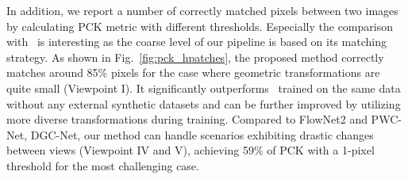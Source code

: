 \documentclass[10pt,twocolumn,letterpaper]{article}
\begin{document}
In addition, we report a number of correctly matched pixels between two images by calculating PCK metric with different thresholds. Especially the comparison with~\cite{Rocco17} is interesting as the coarse level of our pipeline is based on its matching strategy. As shown in Fig.~\ref{fig:pck_hpatches}, the proposed method correctly matches around 85\% pixels for the case where geometric transformations are quite small (Viewpoint I). It significantly outperforms~\cite{Rocco17} trained on the same data without any external synthetic datasets and can be further improved by utilizing more diverse transformations during training. Compared to FlowNet2 and PWC-Net, DGC-Net, our method can handle scenarios exhibiting drastic changes between views (Viewpoint IV and V), achieving 59\% of PCK with a 1-pixel threshold for the most challenging case.
\end{document}
